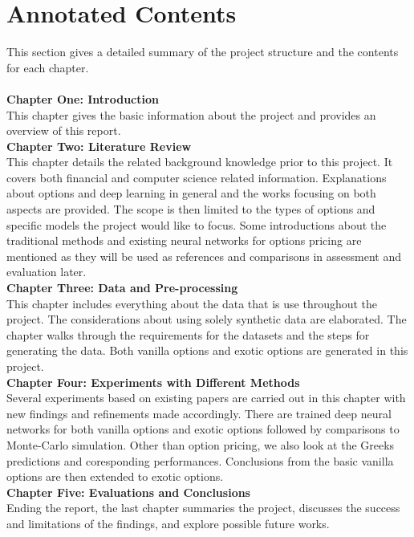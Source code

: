 \documentclass{report}
\begin{document}
\section{Annotated Contents}
This section gives a detailed summary of the project structure and the contents for each chapter.\\\\
\textbf{Chapter One: Introduction}\\
This chapter gives the basic information about the project and provides an overview of this report.\\
\textbf{Chapter Two: Literature Review}\\
This chapter details the related background knowledge prior to this project. It covers both financial and computer science related information. Explanations about options and deep learning in general and the works focusing on both aspects are provided. The scope is then limited to the types of options and specific models the project would like to focus. Some introductions about the traditional methods and existing neural networks for options pricing are mentioned as they will be used as references and comparisons in assessment and evaluation later.\\
\textbf{Chapter Three: Data and Pre-processing}\\
This chapter includes everything about the data that is use throughout the project. The considerations about using solely synthetic data are elaborated. The chapter walks through the requirements for the datasets and the steps for generating the data. Both vanilla options and exotic options are generated in this project.\\
\textbf{Chapter Four: Experiments with Different Methods}\\
Several experiments based on existing papers are carried out in this chapter with new findings and refinements made accordingly. There are trained deep neural networks for both vanilla options and exotic options followed by comparisons to Monte-Carlo simulation. Other than option pricing, we also look at the Greeks predictions and coresponding performances. Conclusions from the basic vanilla options are then extended to exotic options.\\
\textbf{Chapter Five: Evaluations and Conclusions}\\
Ending the report, the last chapter summaries the project, discusses the success and limitations of the findings, and explore possible future works.\\
\end{document}
